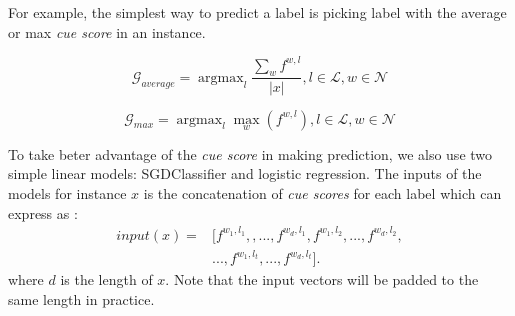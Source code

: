For example, the simplest way to predict a label is picking label with the average or 
max \textit{cue score} in an instance. 

\begin{equation}
     \mathcal{G}_{average} = \mathop{\arg\max}_{l}{\frac{\sum_{w}f^{w,l}}{|x|}},  l\in{{\mathcal{L}}}, w \in \mathcal{N}
\end{equation}

\begin{equation}
 \mathcal{G}_{max} = \mathop{\arg\max}_{l}{\max_w(f^{w,l})},  
l\in {\mathcal{L}}, w\in \mathcal{N} 
\end{equation}



To take beter advantage of the \textit{cue score} in making prediction, 
we also use two simple linear models: SGDClassifier and logistic regression. 
The inputs of the models for instance $x$ is the concatenation of \textit{cue scores} 
for each label which can express as : 
\begin{equation}
\begin{aligned}
input(x) = &[ f^{w_1, l_1},,..., f^{w_d, l_1},  f^{w_1, l_2},..., f^{w_d,l_2},\\&
..., f^{w_1,l_t},..., f^{w_d,l_t}].
\end{aligned}
\end{equation}
where $d$ is the length of $x$. Note that the input vectors will be padded
to the same length in practice.
 
